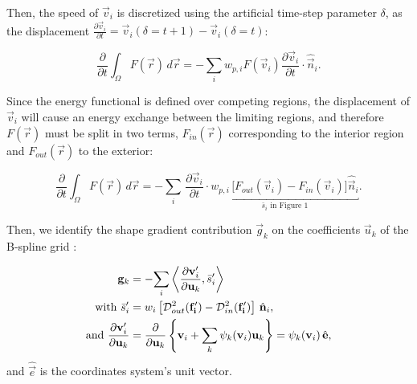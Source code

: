 Then, the speed of $\vec{v}_i$ is discretized using the artificial time-step parameter $\delta$, as the displacement
  $\frac{\partial \vec{v}_i}{\partial t} = \vec{v}_i(\delta = t+1) - \vec{v}_i(\delta = t)$:

  \begin{equation}
  \frac{\partial}{\partial t} \int_\Omega F(\vec{r}) \, d\vec{r} =
  - \underset{i}{\sum} w_{p,i} F(\vec{v}_i) \frac{\partial \vec{v}_i}{\partial t} \cdot \hat{\vec{n}}_i.
  \label{eq:regseg-shape_gradient_disc1}
  \end{equation}

Since the energy functional is defined over competing regions, the displacement of $\vec{v}_i$ will cause
  an energy exchange between the limiting regions, and therefore $F(\vec{r})$ must be split in
  two terms, $F_{in}(\vec{r})$ corresponding to the interior region and $F_{out}(\vec{r})$ to the exterior:

  \begin{equation}
  \frac{\partial}{\partial t} \int_\Omega F(\vec{r}) \, d\vec{r} =
  - \underset{i}{\sum} \, \frac{\partial \vec{v}_i}{\partial t} \cdot
  \underbracket{w_{p,i} \, \Big[ F_{out}(\vec{v}_i) - F_{in}(\vec{v}_i) \Big] \hat{\vec{n}}_i}_{\bar{s}_i \text{ in Figure 1}}.
  \label{eq:regseg-shape_gradient_disc2}
  \end{equation}

Then, we identify the shape gradient contribution $\vec{g}_k$ on the coefficients $\vec{u}_k$ of the B-spline grid 
:

  \begin{equation}
  \label{eq:regseg-gradient_wshape}
  \begin{split}
  \vec{g}_k &= - \underset{i}{\sum} \left\langle \frac{\partial \vec{v}_i'}{\partial \vec{u}_k}, \bar{s}_i'\right\rangle \\
  \text{with }
  \bar{s}_i' &= w_i \left[ \mdist{f_i'}{out} - \mdist{f_i'}{in} \right] \, \hat{\vec{n}}_i, \\
  \text{and }
  \frac{\partial \vec{v}_i'}{\partial \vec{u}_k} &=
  \frac{\partial}{\partial \vec{u}_k} \left\{ \vec{v}_i + \sum_k \psi_k(\vec{v}_i) \vec{u}_k \right\} = \psi_k(\vec{v}_i)\, \hat{\vec{e}},
  \end{split}
  \end{equation}%
 and
  $\hat{\vec{e}}$ is the coordinates system's unit vector.


